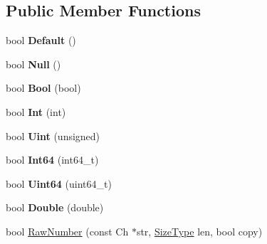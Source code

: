 \subsection*{Public Member Functions}
\begin{DoxyCompactItemize}
\item 
bool {\bfseries Default} ()\hypertarget{structBaseReaderHandler_a836437f6ccc37f08ff933f009b18a78c}{}\label{structBaseReaderHandler_a836437f6ccc37f08ff933f009b18a78c}

\item 
bool {\bfseries Null} ()\hypertarget{structBaseReaderHandler_ae2ebbde4628bf3659ddc5d18520935f5}{}\label{structBaseReaderHandler_ae2ebbde4628bf3659ddc5d18520935f5}

\item 
bool {\bfseries Bool} (bool)\hypertarget{structBaseReaderHandler_aa1c3ce42dbb856b3349792dc9d963587}{}\label{structBaseReaderHandler_aa1c3ce42dbb856b3349792dc9d963587}

\item 
bool {\bfseries Int} (int)\hypertarget{structBaseReaderHandler_a85e813aaf7189a2f87bd53953324fafc}{}\label{structBaseReaderHandler_a85e813aaf7189a2f87bd53953324fafc}

\item 
bool {\bfseries Uint} (unsigned)\hypertarget{structBaseReaderHandler_a0e683306cbb7b4e350a35c18c5246f2a}{}\label{structBaseReaderHandler_a0e683306cbb7b4e350a35c18c5246f2a}

\item 
bool {\bfseries Int64} (int64\+\_\+t)\hypertarget{structBaseReaderHandler_a04011733ea584739c97ad5c6afa15a35}{}\label{structBaseReaderHandler_a04011733ea584739c97ad5c6afa15a35}

\item 
bool {\bfseries Uint64} (uint64\+\_\+t)\hypertarget{structBaseReaderHandler_a351aa3cd81856a487c21022e9cc64d2b}{}\label{structBaseReaderHandler_a351aa3cd81856a487c21022e9cc64d2b}

\item 
bool {\bfseries Double} (double)\hypertarget{structBaseReaderHandler_a8156ea6ae5b8cd23a8b700e92a8af1eb}{}\label{structBaseReaderHandler_a8156ea6ae5b8cd23a8b700e92a8af1eb}

\item 
bool \hyperlink{structBaseReaderHandler_a9ed0d83d5e6c8f5e4b32ca3735ff0bb7}{Raw\+Number} (const Ch $\ast$str, \hyperlink{rapidjson_8h_a5ed6e6e67250fadbd041127e6386dcb5}{Size\+Type} len, bool copy)\hypertarget{structBaseReaderHandler_a9ed0d83d5e6c8f5e4b32ca3735ff0bb7}{}\label{structBaseReaderHandler_a9ed0d83d5e6c8f5e4b32ca3735ff0bb7}


\end{DoxyCompactItemize}
